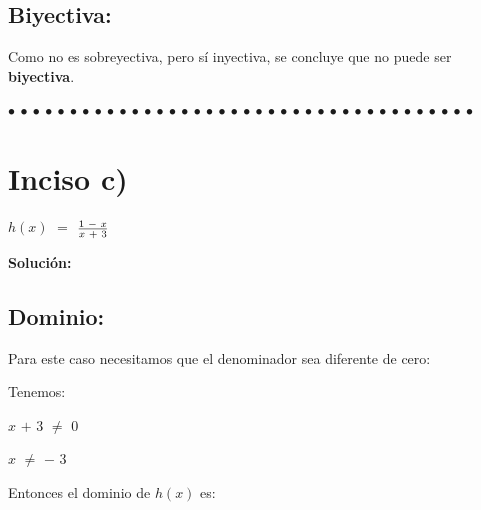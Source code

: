 \documentclass[12pt]{article}
\newenvironment{MyColorPar}[1]{%
    \leavevmode\color{#1}\ignorespaces%
}{%
}%
\begin{document}
\subsection*{{\textcolor{Lochinvar}{\bfseries{Biyectiva}:}}} Como no es sobreyectiva, pero sí inyectiva, se concluye que no puede ser {\bfseries{biyectiva}}. \vspace{0.5cm}

\begin{MyColorPar}{Saffron} \bfseries{
 $\bullet$ $\bullet$ $\bullet$ $\bullet$ $\bullet$ $\bullet$ $\bullet$ $\bullet$ $\bullet$ $\bullet$ $\bullet$ $\bullet$ $\bullet$ $\bullet$ $\bullet$ $\bullet$ $\bullet$ $\bullet$ $\bullet$ $\bullet$ $\bullet$ $\bullet$ $\bullet$ $\bullet$ $\bullet$ $\bullet$ $\bullet$ $\bullet$ $\bullet$ $\bullet$ $\bullet$ $\bullet$ $\bullet$ $\bullet$ $\bullet$ $\bullet$ $\bullet$ $\bullet$  }
\end{MyColorPar} \vspace{0.5cm}

\section*{{\textcolor{Tarawera}{\textsf{Inciso c)}}}} $h(x)$ $=$ {\LARGE{$\frac{1 \hspace{0.1cm} - \hspace{0.1cm} x}{x \hspace{0.1cm} + \hspace{0.1cm} 3}$}} \vspace{0.5cm}

{\textcolor{Cinnabar}{\bfseries{Solución}:}} \vspace{0.5cm}

\subsection*{{\textcolor{Lochinvar}{\bfseries{Dominio}:}}} Para este caso necesitamos que el denominador sea diferente de cero: \vspace{0.5cm}

Tenemos: \vspace{0.5cm}

\hspace{4cm} $x$ $+$ $3$ $\neq$ $0$ \vspace{0.5cm}

\hspace{4cm} $x$ $\neq$ $-$ $3$ \vspace{0.5cm}

Entonces el dominio de $h(x)$ es: \vspace{0.5cm} 
\end{document}
